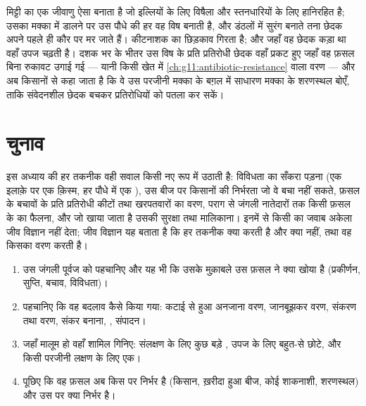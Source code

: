 \begin{example}[मक्का में कोई विष जीन]\label{ex:g12:domesticated-plants:bt}
मिट्टी का एक जीवाणु ऐसा  बनाता है जो इल्लियों के लिए विषैला और
स्तनधारियों के लिए हानिरहित है; उसका  मक्का में डालने पर उस पौधे की हर
 वह विष बनाती है, और डंठलों में सुरंग बनाते तना छेदक अपने पहले ही कौर
पर मर जाते हैं। कीटनाशक का छिड़काव गिरता है; और जहाँ वह छेदक कड़ा था वहाँ
उपज चढ़ती है। दशक भर के भीतर उस विष के प्रति प्रतिरोधी छेदक वहाँ प्रकट हुए
जहाँ वह फ़सल बिना रुकावट उगाई गई --- यानी किसी खेत में
\cref{ch:g11:antibiotic-resistance} वाला वरण --- और अब किसानों से कहा जाता
है कि वे उस परजीनी मक्का के बग़ल में साधारण मक्का के शरणस्थल बोएँ, ताकि
संवेदनशील छेदक बचकर प्रतिरोधियों को पतला कर सकें।
\end{example}

\section{चुनाव}

\begin{proposition}[दाँव पर क्या है]\label{prop:g12:domesticated-plants:stakes}
इस अध्याय की हर तकनीक वही सवाल किसी नए रूप में उठाती है: विविधता का सँकरा
पड़ना (एक इलाक़े पर एक क़िस्म, हर पौधे में एक ), उस बीज पर किसानों की
निर्भरता जो वे बचा नहीं सकते, फ़सल के बचावों के प्रति प्रतिरोधी कीटों तथा
खरपतवारों का वरण, पराग से जंगली नातेदारों तक किसी फ़सल के  का फैलना, और
जो खाया जाता है उसकी सुरक्षा तथा मालिकाना। इनमें से किसी का जवाब अकेला जीव
विज्ञान नहीं देता; जीव विज्ञान यह बताता है कि हर तकनीक क्या करती है और क्या
नहीं, तथा वह किसका वरण करती है।
\end{proposition}
\admitted

\begin{method}[किसी फ़सल का इतिहास पढ़ना]\label{met:g12:domesticated-plants:read}
\begin{enumerate}
  \item उस जंगली पूर्वज को पहचानिए और यह भी कि उसके मुक़ाबले उस फ़सल ने क्या
        खोया है (प्रकीर्णन, सुप्ति, बचाव, विविधता)।
  \item पहचानिए कि वह बदलाव कैसे किया गया: कटाई से हुआ अनजाना वरण,
        जानबूझकर वरण, संकरण तथा वरण, संकर बनाना, , संपादन।
  \item जहाँ मालूम हो वहाँ शामिल  गिनिए:  संलक्षण के लिए कुछ
        बड़े , उपज के लिए बहुत-से छोटे, और किसी परजीनी लक्षण के लिए एक।
  \item पूछिए कि वह फ़सल अब किस पर निर्भर है (किसान, ख़रीदा हुआ बीज, कोई
        शाकनाशी, शरणस्थल) और उस पर क्या निर्भर है।
\end{enumerate}
\end{method}

